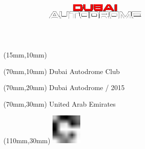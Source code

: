 \null\newpage
\begin{textblock*}{50mm}(15mm,10mm)%
\includegraphics[width=50mm]{LG/DUB.png}
\end{textblock*}
\begin{textblock*}{130mm}(70mm,10mm)%
{\fontsize{20}{20}\selectfont Dubai Autodrome Club}\\
\end{textblock*}
\begin{textblock*}{120mm}(70mm,20mm)%
{\fontsize{16}{16}\selectfont Dubai Autodrome / 2015}\\
\end{textblock*}
\begin{textblock*}{120mm}(70mm,30mm)%
{\fontsize{12}{12}\selectfont United Arab Emirates}
\end{textblock*}
\begin{textblock*}{30mm}(110mm,30mm)%
\centering
\includegraphics[height=15mm]{icons/fa-rotate-right.pdf}
\end{textblock*}

